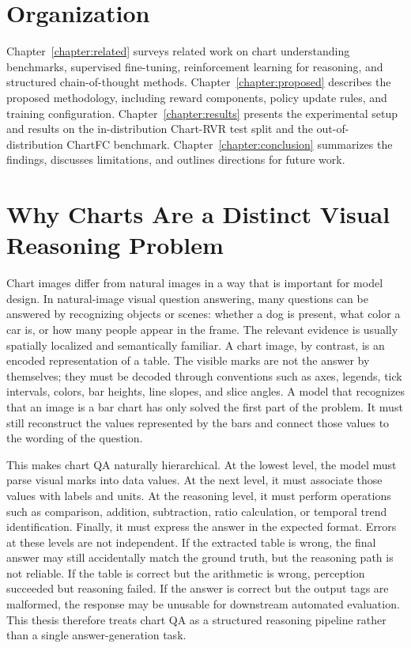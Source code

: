 \documentclass{iutbscthesis}
\begin{document}
\section{Organization}

Chapter~\ref{chapter:related} surveys related work on chart understanding benchmarks, supervised fine-tuning, reinforcement learning for reasoning, and structured chain-of-thought methods. Chapter~\ref{chapter:proposed} describes the proposed methodology, including reward components, policy update rules, and training configuration. Chapter~\ref{chapter:results} presents the experimental setup and results on the in-distribution Chart-RVR test split and the out-of-distribution ChartFC benchmark. Chapter~\ref{chapter:conclusion} summarizes the findings, discusses limitations, and outlines directions for future work.

\section{Why Charts Are a Distinct Visual Reasoning Problem}

Chart images differ from natural images in a way that is important for model design. In natural-image visual question answering, many questions can be answered by recognizing objects or scenes: whether a dog is present, what color a car is, or how many people appear in the frame. The relevant evidence is usually spatially localized and semantically familiar. A chart image, by contrast, is an encoded representation of a table. The visible marks are not the answer by themselves; they must be decoded through conventions such as axes, legends, tick intervals, colors, bar heights, line slopes, and slice angles. A model that recognizes that an image is a bar chart has only solved the first part of the problem. It must still reconstruct the values represented by the bars and connect those values to the wording of the question.

This makes chart QA naturally hierarchical. At the lowest level, the model must parse visual marks into data values. At the next level, it must associate those values with labels and units. At the reasoning level, it must perform operations such as comparison, addition, subtraction, ratio calculation, or temporal trend identification. Finally, it must express the answer in the expected format. Errors at these levels are not independent. If the extracted table is wrong, the final answer may still accidentally match the ground truth, but the reasoning path is not reliable. If the table is correct but the arithmetic is wrong, perception succeeded but reasoning failed. If the answer is correct but the output tags are malformed, the response may be unusable for downstream automated evaluation. This thesis therefore treats chart QA as a structured reasoning pipeline rather than a single answer-generation task.
\end{document}
